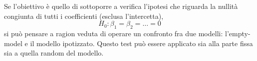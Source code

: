 \documentclass[a4page, 11pt]{article} %
\begin{document}
Se l’obiettivo è quello di sottoporre a verifica l’ipotesi che riguarda la nullità congiunta di tutti i coefficienti (esclusa l’intercetta),
\begin{equation*}
H_0 : \beta_1 = \beta_2 = \dots = 0
\end{equation*}
si può pensare a ragion veduta di operare un confronto fra due modelli: l’empty-model e il modello ipotizzato. 
Questo test può essere applicato sia alla parte fissa sia a quella random del modello.

\end{document}
